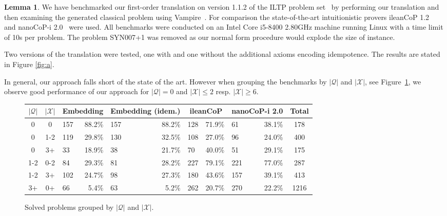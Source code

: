 \documentclass{easychair}
\theoremstyle{definition}
\theoremstyle{definition}
\theoremstyle{definition}
\newtheorem{lemma}[theorem]{Lemma}
\theoremstyle{definition}
\theoremstyle{definition}
\theoremstyle{definition}
\theoremstyle{definition}
\begin{document}
\begin{lemma}
We have benchmarked our first-order translation on version 1.1.2 of the ILTP problem set~\cite{iltp} by performing our translation and then examining the generated classical problem using Vampire~\cite{kovacs2013first}.
For comparison the state-of-the-art intuitionistic provers ileanCoP 1.2~\cite{otten2008leancop} and nanoCoP-i 2.0~\cite{otten2021nanocop} were used. All benchmarks were conducted on an Intel Core i5-8400 2.80GHz machine running Linux with a time limit of 10s per problem. The problem \textsc{SYN007+1} was removed as our normal form procedure would explode the size of instance.

Two versions of the translation were tested, one with and one without the additional axioms encoding idempotence. The results are stated in Figure \ref{fig:a}.

In general, our approach falls short of the state of the art. 
However when grouping the benchmarks by $|\mathcal Q|$ and $|\mathcal X|$, see Figure~\ref{fig:b},
we observe good performance of our approach for $|\mathcal Q| = 0$ and $|\mathcal X| \leq 2$ resp. $|\mathcal X| \geq 6$.

\begin{figure}
	\centering
	\begin{tabular}{c|c|lr|lr|lr|lr|c}
		$|\mathcal Q|$&$|\mathcal X|$&\multicolumn{2}{c}{Embedding}&\multicolumn{2}{c}{Embedding (idem.)}&\multicolumn{2}{c}{ileanCoP}&\multicolumn{2}{c}{nanoCoP-i 2.0}&Total\\\hline
		0&0		&157&88.2\%	&157&88.2\%		&128&71.9\%		&61&38.1\%	&178\\
		0&1-2	&119&29.8\%&130&32.5\%		&108&27.0\%		&96&24.0\%	&400\\
		0&3+	&33&18.9\%	&38&21.7\%		&70&40.0\%		&51&29.1\%	&175\\
		1-2&0-2	&84&29.3\%	&81&28.2\%		&227&79.1\%		&221&77.0\%	&287\\
		1-2&3+	&102&24.7\%	&98&27.3\%		&180&43.6\%		&157&39.1\%	&413\\
		3+&0+	&66&5.4\%	&63&5.2\%		&262&20.7\%		&270&22.2\%	&1216\\
	\end{tabular}
	\caption{Solved problems grouped by $|\mathcal Q|$ and $|\mathcal X|$.}
	\label{fig:b}
\end{figure}



\end{lemma}
\end{document}
